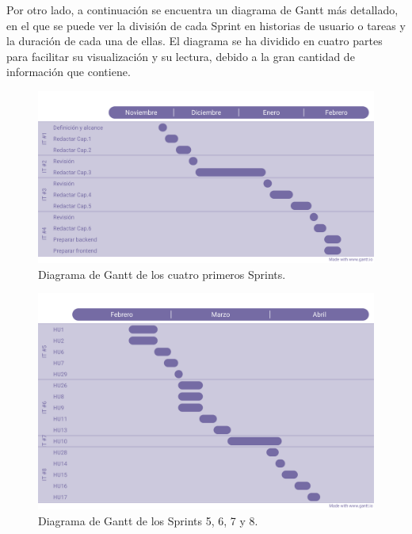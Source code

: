 Por otro lado, a continuación se encuentra un diagrama de Gantt más detallado, en el que se puede ver la división de 
cada Sprint en historias de usuario o tareas y la duración de cada una de ellas. El diagrama se ha dividido en cuatro partes
para facilitar su visualización y su lectura, debido a la gran cantidad de información que contiene.

\begin{figure}[H]
    \centering
    \centerline{\includegraphics[width=1\textwidth]{imagenes/c4/gantt1.png}}
    \caption{Diagrama de Gantt de los cuatro primeros Sprints.}
    \label{fig:diagrama_gantt1}
\end{figure}

\begin{figure}[H]

    \centering
    \centerline{\includegraphics[width=1\textwidth]{imagenes/c4/gantt2.png}}
    \caption{Diagrama de Gantt de los Sprints 5, 6, 7 y 8.}
    \label{fig:diagrama_gantt2}
\end{figure}

